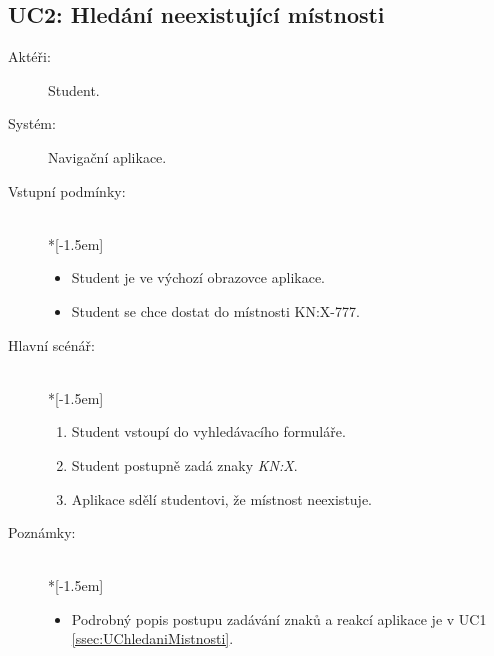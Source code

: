 \subsection{UC2: Hledání neexistující místnosti}
\begin{description}
\item[Aktéři:] Student.
\item[Systém:] Navigační aplikace.
\item[Vstupní podmínky:] ~\\*[-1.5em]
 \begin{itemize}
 \item Student je ve výchozí obrazovce aplikace.
 \item Student se chce dostat do místnosti KN:X-777.
 \end{itemize}
\item[Hlavní scénář:] ~\\*[-1.5em]
 \begin{enumerate}
 \item Student vstoupí do vyhledávacího formuláře.
 \item Student postupně zadá znaky \emph{KN:X}.
 \item Aplikace sdělí studentovi, že místnost neexistuje.
 \end{enumerate}
\item[Poznámky:] ~\\*[-1.5em]
 \begin{itemize}
 \item Podrobný popis postupu zadávání znaků a reakcí aplikace je v UC1 \ref{ssec:UChledaniMistnosti}.
 \end{itemize}
\end{description}

\pagebreak
